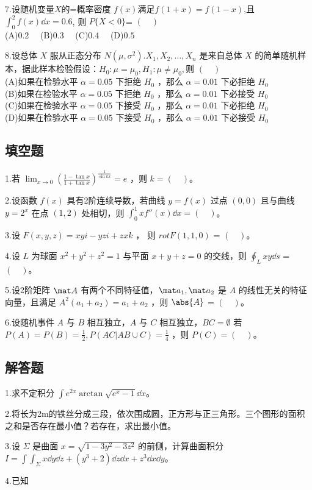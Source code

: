 7.设随机变量$X$的=概率密度 $f(x)$满足$f(1+x)=f(1-x)$,且 $\int_0^2 f(x)\dd{x}=0.6$, 则 $P\{X<0\}$= $(\quad)$\\
(A)$0.2 \quad$
(B)$0.3 \quad$
(C)$0.4 \quad$
(D)$0.5 \quad$


8.设总体 $X$ 服从正态分布 $N(\mu,\sigma^2).X_1,X_2,\dots,X_n$ 是来自总体 $X$ 的简单随机样本，据此样本检验假设：$H_0:\mu=\mu_0,H_1:\mu\neq \mu_0,$则 $(\quad)$\\
(A)如果在检验水平 $\alpha=0.05$ 下拒绝 $H_0$ ，那么 $\alpha=0.01$ 下必拒绝 $H_0$\\
(B)如果在检验水平 $\alpha=0.05$ 下拒绝 $H_0$ ，那么 $\alpha=0.01$ 下必接受 $H_0$\\
(C)如果在检验水平 $\alpha=0.05$ 下接受 $H_0$ ，那么 $\alpha=0.01$ 下必拒绝 $H_0$\\
(D)如果在检验水平 $\alpha=0.05$ 下接受 $H_0$ ，那么 $\alpha=0.01$ 下必接受 $H_0$

\subsection{填空题}
1.若 $\displaystyle \lim_{x \to  0} (\frac{1-\tan x}{1+\tan x})^\frac{1}{\sin kx}=e$ ，则 $k=(\quad)$。

2.设函数 $f(x)$ 具有2阶连续导数，若曲线 $y=f(x)$ 过点 $(0,0)$ 且与曲线 $y=2^x$ 在点 $(1,2)$ 处相切，则 $\int_0^1 xf''(x) \dd{x}= (\quad)$。

3.设 $F(x,y,z)=xyi-yzi+zxk$ ， 则 $rot  F(1,1,0)$ = $(\quad)$。

4.设 $L$ 为球面 $x^2+y^2+z^2=1$ 与平面 $x+y+z=0$ 的交线，则 $\oint_L xy\dd{s}$ = $(\quad)$。

5.设2阶矩阵 $\mat A$ 有两个不同特征值，$\mat a_1,\mat a_2$  是 $A$ 的线性无关的特征向量，且满足 $A^2(a_1+a_2)=a_1+a_2$ ，则 $\abs{A}$ = $(\quad)$。

6.设随机事件 $A$ 与 $B$ 相互独立，$A$ 与 $C$ 相互独立，$BC=\emptyset$ 若 $P(A)=P(B)=\frac{1}{2},P(AC|AB \cup C)=\frac{1}{4}$ ，则 $P(C)= (\quad)$。

\subsection{解答题}
1.求不定积分 $\displaystyle \int e^{2x}\arctan \sqrt{e^x-1}\dd{x}$。

2.将长为2m的铁丝分成三段，依次围成圆，正方形与正三角形。三个图形的面积之和是否存在最小值？若存在，求出最小值。

3.设 $\Sigma$ 是曲面 $x=\sqrt{1-3y^2-3z^2}$ 的前侧，计算曲面积分 $\displaystyle I=\int\int_\Sigma x\dd{y}\dd{z}+(y^3+2)\dd{z}\dd{x}+z^3 \dd{x}\dd{y}$。

4.已知